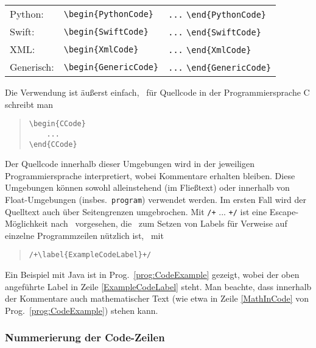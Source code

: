 \begin{table}
\begin{tabular}{@{}lll@{}}
	Python:      & \verb!\begin{PythonCode}!
		& \verb!...! \verb!\end{PythonCode}! \\
	Swift:       & \verb!\begin{SwiftCode}!
		& \verb!...! \verb!\end{SwiftCode}! \\
	XML:         & \verb!\begin{XmlCode}!
		& \verb!...! \verb!\end{XmlCode}! \\
	Generisch:   & \verb!\begin{GenericCode}!
		& \verb!...! \verb!\end{GenericCode}! \\
	\bottomrule
\end{tabular}
\end{table}
%
Die Verwendung ist äußerst einfach, \zB\ für Quellcode in der
Programmiersprache C schreibt man
%
\begin{quote}
\begin{verbatim}
\begin{CCode}
    ... 
\end{CCode}
\end{verbatim}
\end{quote}
%
Der Quellcode innerhalb dieser Umgebungen wird in der jeweiligen
Programmiersprache interpretiert, wobei Kommentare erhalten bleiben. Diese
Umgebungen können sowohl alleinstehend (im Fließtext) oder innerhalb von
Float-Umgebungen (insbes.\ \texttt{program}) verwendet werden. Im ersten Fall
wird der Quelltext auch über Seitengrenzen umgebrochen. Mit \verb!/+! ...
\verb!+/! ist eine Escape-Möglichkeit nach \latex\ vorgesehen, die \va\ zum
Setzen von Labels für Verweise auf einzelne Programmzeilen nützlich ist, \zB\
mit
%
\begin{quote}
	\verb!/+\label{ExampleCodeLabel}+/!
\end{quote}
%
Ein Beispiel mit Java ist in Prog.~\ref{prog:CodeExample} gezeigt, wobei der
oben angeführte Label in Zeile \ref{ExampleCodeLabel} steht. Man beachte,
dass innerhalb der Kommentare auch mathematischer Text (wie etwa in Zeile
\ref{MathInCode} von Prog.~\ref{prog:CodeExample}) stehen kann.


\subsubsection{Nummerierung der Code-Zeilen}

